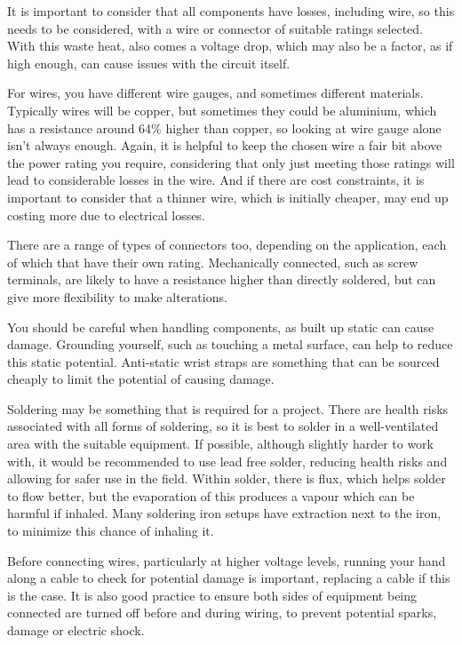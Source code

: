 \documentclass[a4paper,11pt]{report}
\begin{document}
It is important to consider that all components have losses, including wire, so this needs to be considered, with a wire or connector of suitable ratings selected. With this waste heat, also comes a voltage drop, which may also be a factor, as if high enough, can cause issues with the circuit itself.

For wires, you have different wire gauges, and sometimes different materials. Typically wires will be copper, but sometimes they could be aluminium, which has a resistance around 64\% higher than copper, so looking at wire gauge alone isn't always enough. Again, it is helpful to keep the chosen wire a fair bit above the power rating you require, considering that only just meeting those ratings will lead to considerable losses in the wire. And if there are cost constraints, it is important to consider that a thinner wire, which is initially cheaper, may end up costing more due to electrical losses.

There are a range of types of connectors too, depending on the application, each of which that have their own rating. Mechanically connected, such as screw terminals, are likely to have a resistance higher than directly soldered, but can give more flexibility to make alterations.

You should be careful when handling components, as built up static can cause damage. Grounding yourself, such as touching a metal surface, can help to reduce this static potential. Anti-static wrist straps are something that can be sourced cheaply to limit the potential of causing damage.

Soldering may be something that is required for a project. There are health risks associated with all forms of soldering, so it is best to solder in a well-ventilated area with the suitable equipment. If possible, although slightly harder to work with, it would be recommended to use lead free solder, reducing health risks and allowing for safer use in the field. Within solder, there is flux, which helps solder to flow better, but the evaporation of this produces a vapour which can be harmful if inhaled. Many soldering iron setups have extraction next to the iron, to minimize this chance of inhaling it.

Before connecting wires, particularly at higher voltage levels, running your hand along a cable to check for potential damage is important, replacing a cable if this is the case. It is also good practice to ensure both sides of equipment being connected are turned off before and during wiring, to prevent potential sparks, damage or electric shock.
\end{document}
